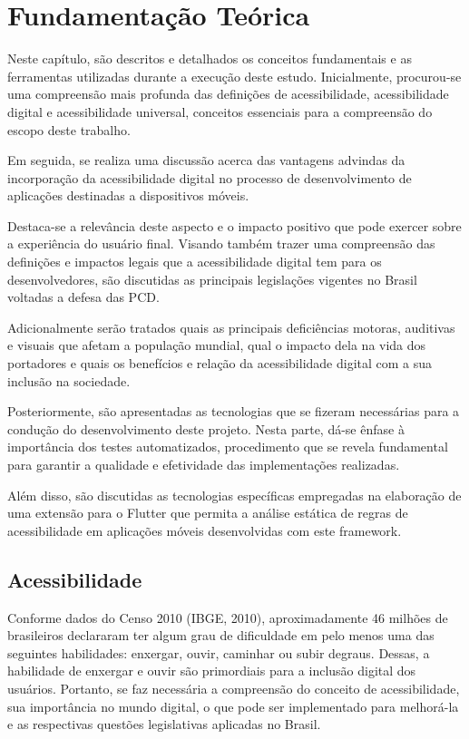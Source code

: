 \chapter{Fundamentação Teórica}

Neste capítulo, são descritos e detalhados os conceitos fundamentais e as ferramentas utilizadas durante a execução deste estudo. Inicialmente, procurou-se uma compreensão mais profunda das definições de acessibilidade, acessibilidade digital e acessibilidade universal, conceitos essenciais para a compreensão do escopo deste trabalho.

Em seguida, se realiza uma discussão acerca das vantagens advindas da incorporação da acessibilidade digital no processo de desenvolvimento de aplicações destinadas a dispositivos móveis.

Destaca-se a relevância deste aspecto e o impacto positivo que pode exercer sobre a experiência do usuário final. Visando também trazer uma compreensão das definições e impactos legais que a acessibilidade digital tem para os desenvolvedores, são discutidas as principais legislações vigentes no Brasil voltadas a defesa das PCD. 

Adicionalmente serão tratados quais as principais deficiências motoras, auditivas e visuais que afetam a população mundial, qual o impacto dela na vida dos portadores e quais os benefícios e relação da acessibilidade digital com a sua inclusão na sociedade.

Posteriormente, são apresentadas as tecnologias que se fizeram necessárias para a condução do desenvolvimento deste projeto. Nesta parte, dá-se ênfase à importância dos testes automatizados, procedimento que se revela fundamental para garantir a qualidade e efetividade das implementações realizadas.

Além disso, são discutidas as tecnologias específicas empregadas na elaboração de uma extensão para o Flutter que permita a análise estática de regras de acessibilidade em aplicações móveis desenvolvidas com este framework.

\section{Acessibilidade}

Conforme dados do Censo 2010 (IBGE, 2010), aproximadamente 46 milhões de brasileiros declararam ter algum grau de dificuldade em pelo menos uma das seguintes habilidades: enxergar, ouvir, caminhar ou subir degraus. Dessas, a habilidade de enxergar e ouvir são primordiais para a inclusão digital dos usuários. Portanto, se faz necessária a compreensão do conceito de acessibilidade, sua importância no mundo digital, o que pode ser implementado para melhorá-la e as respectivas questões legislativas aplicadas no Brasil.

